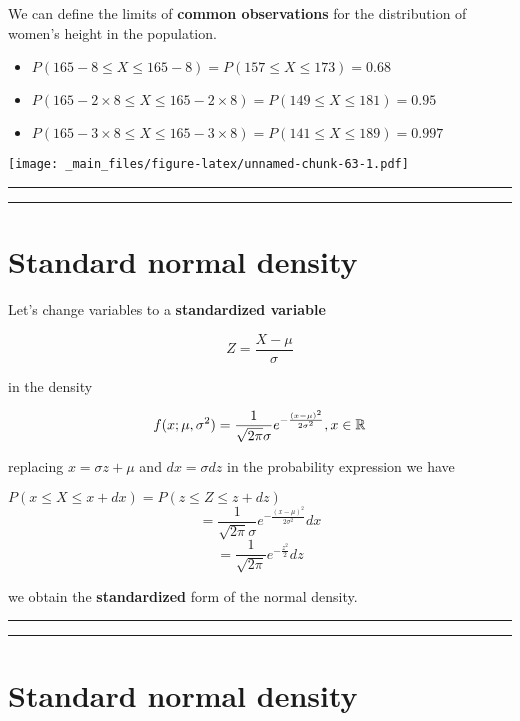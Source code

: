\documentclass[
]{book}
\providecommand{\tightlist}{%
  \setlength{\itemsep}{0pt}\setlength{\parskip}{0pt}}
\begin{document}
We can define the limits of \textbf{common observations} for the distribution of women's height in the population.

\begin{itemize}
\tightlist
\item
  \(P(165-8 \leq X \leq 165-8)=P(157 \leq X \leq 173)=0.68\)
\item
  \(P(165-2 \times 8 \leq X \leq 165-2\times 8)=P(149 \leq X \leq 181)=0.95\)
\item
  \(P(165-3 \times 8 \leq X \leq 165-3\times 8)=P(141 \leq X \leq 189)=0.997\)
\end{itemize}

\texttt{[image: \_main\_files/figure-latex/unnamed-chunk-63-1.pdf]}

\begin{center}\rule{0.5\linewidth}{0.5pt}\end{center}

\begin{center}\rule{0.5\linewidth}{0.5pt}\end{center}

\hypertarget{standard-normal-density}{%
\section{Standard normal density}\label{standard-normal-density}}

Let's change variables to a \textbf{standardized variable}

\[Z=\frac{X-\mu}{\sigma}\]

in the density

\[f(x; \mu, \sigma^2)=\frac{1}{\sqrt{2\pi}\sigma}e^{-\frac{(x-\mu)^2}{2\sigma^2}}, x \in {\Bbb R}\]

replacing \(x=\sigma z+\mu\) and \(dx=\sigma dz\) in the probability expression we have

\(P(x\leq X \leq x +dx)=P(z\leq Z \leq z +dz)\)
\[=\frac{1}{\sqrt{2\pi}\sigma}e^{-\frac{(x-\mu)^2}{2\sigma^2}}dx\] \[=\frac{1}{ \sqrt{2\pi}}e^{-\frac{z^2}{2}} dz\]

we obtain the \textbf{standardized} form of the normal density.

\begin{center}\rule{0.5\linewidth}{0.5pt}\end{center}

\begin{center}\rule{0.5\linewidth}{0.5pt}\end{center}

\hypertarget{standard-normal-density-1}{%
\section{Standard normal density}\label{standard-normal-density-1}}
\end{document}
